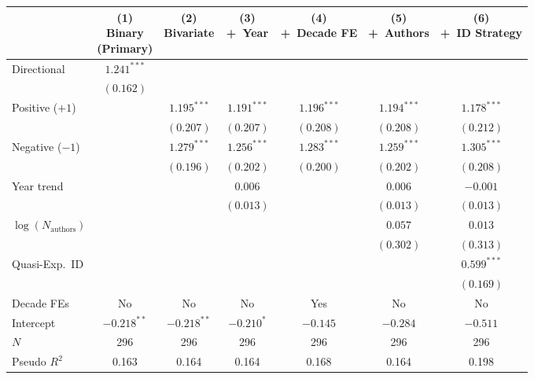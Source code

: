 \begin{tabular}{lcccccc}
\toprule
 & \shortstack{(1)\\Binary\\(Primary)} & \shortstack{(2)\\Bivariate} & \shortstack{(3)\\+~Year} & \shortstack{(4)\\+~Decade FE} & \shortstack{(5)\\+~Authors} & \shortstack{(6)\\+~ID Strategy} \\
\midrule
Directional     & $1.241^{***}$ &               &               &               &               &               \\
                & $(0.162)$     &               &               &               &               &               \\[4pt]
Positive ($+1$) &               & $1.195^{***}$ & $1.191^{***}$ & $1.196^{***}$ & $1.194^{***}$ & $1.178^{***}$ \\
                &               & $(0.207)$     & $(0.207)$     & $(0.208)$     & $(0.208)$     & $(0.212)$     \\[4pt]
Negative ($-1$) &               & $1.279^{***}$ & $1.256^{***}$ & $1.283^{***}$ & $1.259^{***}$ & $1.305^{***}$ \\
                &               & $(0.196)$     & $(0.202)$     & $(0.200)$     & $(0.202)$     & $(0.208)$     \\[4pt]
Year trend      &               &               & $0.006$       &               & $0.006$       & $-0.001$      \\
                &               &               & $(0.013)$     &               & $(0.013)$     & $(0.013)$     \\[4pt]
$\log(N_{\text{authors}})$ & & &             &               & $0.057$       & $0.013$       \\
                &               &               &               &               & $(0.302)$     & $(0.313)$     \\[4pt]
Quasi-Exp.\ ID  &               &               &               &               &               & $0.599^{***}$ \\
                &               &               &               &               &               & $(0.169)$     \\[4pt]
Decade FEs      & No            & No            & No            & Yes           & No            & No            \\
Intercept       & $-0.218^{**}$ & $-0.218^{**}$ & $-0.210^{*}$  & $-0.145$      & $-0.284$      & $-0.511$      \\
\midrule
$N$             & 296           & 296           & 296           & 296           & 296           & 296           \\
Pseudo $R^2$    & 0.163         & 0.164         & 0.164         & 0.168         & 0.164         & 0.198         \\
\bottomrule
\end{tabular}
